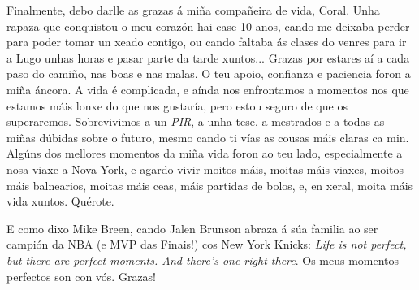 Finalmente, debo darlle as grazas á miña compañeira de vida, Coral. Unha rapaza que conquistou o meu corazón hai case 10 anos, cando me deixaba perder para poder tomar un xeado contigo, ou cando faltaba ás clases do venres para ir a Lugo unhas horas e pasar parte da tarde xuntos... Grazas por estares aí a cada paso do camiño, nas boas e nas malas. O teu apoio, confianza e paciencia foron a miña áncora. A vida é complicada, e aínda nos enfrontamos a momentos nos que estamos máis lonxe do que nos gustaría, pero estou seguro de que os superaremos. Sobrevivimos a un \textit{PIR}, a unha tese, a mestrados e a todas as miñas dúbidas sobre o futuro, mesmo cando ti vías as cousas máis claras ca min. Algúns dos mellores momentos da miña vida foron ao teu lado, especialmente a nosa viaxe a Nova York, e agardo vivir moitos máis, moitas máis viaxes, moitos máis balnearios, moitas máis ceas, máis partidas de bolos, e, en xeral, moita máis vida xuntos. Quérote.

E como dixo Mike Breen, cando Jalen Brunson abraza á súa familia ao ser campión da NBA (e MVP das Finais!) cos New York Knicks: \textit{Life is not perfect, but there are perfect moments. And there's one right there}. Os meus momentos perfectos son con vós. Grazas!
